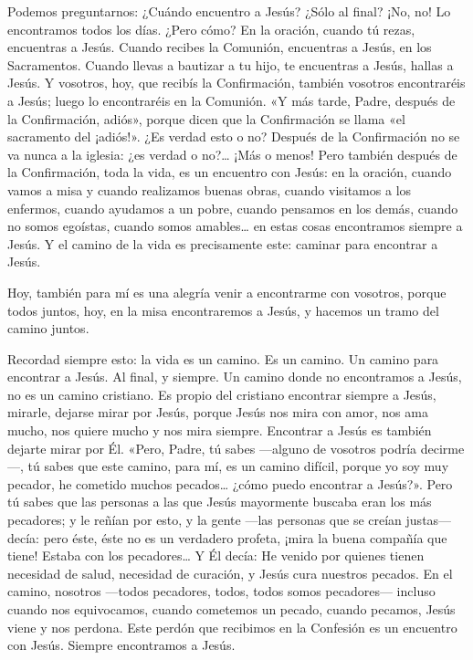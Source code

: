 Podemos preguntarnos: ¿Cuándo encuentro a Jesús? ¿Sólo al final? ¡No,
no! Lo encontramos todos los días. ¿Pero cómo? En la oración, cuando tú
rezas, encuentras a Jesús. Cuando recibes la Comunión, encuentras a
Jesús, en los Sacramentos. Cuando llevas a bautizar a tu hijo, te
encuentras a Jesús, hallas a Jesús. Y vosotros, hoy, que recibís la
Confirmación, también vosotros encontraréis a Jesús; luego lo
encontraréis en la Comunión. «Y más tarde, Padre, después de la
Confirmación, adiós», porque dicen que la Confirmación se llama «el
sacramento del ¡adiós!». ¿Es verdad esto o no? Después de la
Confirmación no se va nunca a la iglesia: ¿es verdad o no?\ldots{} ¡Más
o menos! Pero también después de la Confirmación, toda la vida, es un
encuentro con Jesús: en la oración, cuando vamos a misa y cuando
realizamos buenas obras, cuando visitamos a los enfermos, cuando
ayudamos a un pobre, cuando pensamos en los demás, cuando no somos
egoístas, cuando somos amables\ldots{} en estas cosas encontramos
siempre a Jesús. Y el camino de la vida es precisamente este: caminar
para encontrar a Jesús.

Hoy, también para mí es una alegría venir a encontrarme con vosotros,
porque todos juntos, hoy, en la misa encontraremos a Jesús, y hacemos un
tramo del camino juntos.

Recordad siempre esto: la vida es un camino. Es un camino. Un camino
para encontrar a Jesús. Al final, y siempre. Un camino donde no
encontramos a Jesús, no es un camino cristiano. Es propio del cristiano
encontrar siempre a Jesús, mirarle, dejarse mirar por Jesús, porque
Jesús nos mira con amor, nos ama mucho, nos quiere mucho y nos mira
siempre. Encontrar a Jesús es también dejarte mirar por Él. «Pero,
Padre, tú sabes ---alguno de vosotros podría decirme---, tú sabes que
este camino, para mí, es un camino difícil, porque yo soy muy pecador,
he cometido muchos pecados\ldots{} ¿cómo puedo encontrar a Jesús?». Pero
tú sabes que las personas a las que Jesús mayormente buscaba eran los
más pecadores; y le reñían por esto, y la gente ---las personas que se
creían justas--- decía: pero éste, éste no es un verdadero profeta,
¡mira la buena compañía que tiene! Estaba con los pecadores\ldots{} Y Él
decía: He venido por quienes tienen necesidad de salud, necesidad de
curación, y Jesús cura nuestros pecados. En el camino, nosotros ---todos
pecadores, todos, todos somos pecadores--- incluso cuando nos
equivocamos, cuando cometemos un pecado, cuando pecamos, Jesús viene y
nos perdona. Este perdón que recibimos en la Confesión es un encuentro
con Jesús. Siempre encontramos a Jesús.

